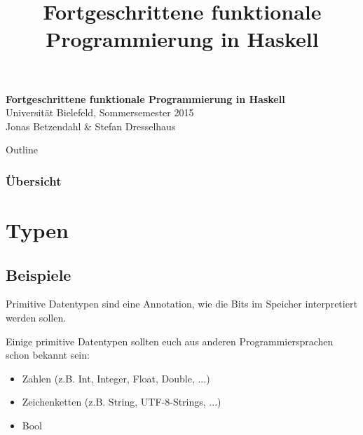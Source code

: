 \documentclass{beamer}
\title{Fortgeschrittene funktionale Programmierung in Haskell}
\begin{document}
  

  \begin{frame}
  \begin{center}
    \huge\textbf{Fortgeschrittene funktionale Programmierung in Haskell}\\ \bigskip
    \LARGE Universität Bielefeld, Sommersemester 2015\\ \bigskip
    \large Jonas Betzendahl \& Stefan Dresselhaus
    \end{center}
  \end{frame}

\begin{frame}[allowframebreaks]{Outline}
\frametitle{Übersicht}
\tableofcontents[hideallsubsections]
\end{frame}

\section{Typen}
\subsection{Beispiele}
\begin{frame}
 Primitive Datentypen sind eine Annotation, wie die Bits im Speicher interpretiert werden sollen. \bigskip
 
 \pause
 
 Einige primitive Datentypen sollten euch aus anderen Programmiersprachen schon bekannt sein:
 
 \begin{itemize}
  \item Zahlen (z.B. Int, Integer, Float, Double, ...)
  \item Zeichenketten (z.B. String, UTF-8-Strings, ...)
  \item Bool
 \end{itemize}
\end{frame}
\end{document}
